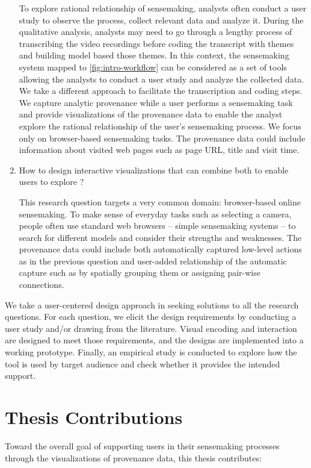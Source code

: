 \begin{enumerate}
	To explore rational relationship of sensemaking, analysts often conduct a user study to observe the process, collect relevant data and analyze it. During the qualitative analysis, analysts may need to go through a lengthy process of transcribing the video recordings before coding the transcript with themes and building model based those themes. In this context, the sensemaking system mapped to \autoref{fig:intro-workflow} can be considered as a set of tools allowing the analysts to conduct a user study and analyze the collected data. We take a different approach to facilitate the transcription and coding steps. We capture analytic provenance while a user performs a sensemaking task and provide visualizations of the provenance data to enable the analyst explore the rational relationship of the user's sensemaking process. We focus only on browser-based sensemaking tasks. The provenance data could include information about visited web pages such as page URL, title and visit time.
	
	\item How to design interactive visualizations that can combine both  to enable users to explore ?
	
	This research question targets a very common domain: browser-based online sensemaking. To make sense of everyday tasks such as selecting a camera, people often use standard web browsers -- simple sensemaking systems -- to search for different models and consider their strengths and weaknesses. The provenance data could include both automatically captured low-level actions as in the previous question and user-added relationship of the automatic capture such as by spatially grouping them or assigning pair-wise connections.
\end{enumerate}

We take a user-centered design approach in seeking solutions to all the research questions. For each question, we elicit the design requirements by conducting a user study and/or drawing from the literature. Visual encoding and interaction are designed to meet those requirements, and the designs are implemented into a working prototype. Finally, an empirical study is conducted to explore how the tool is used by target audience and check whether it provides the intended support. 

\section{Thesis Contributions}
Toward the overall goal of supporting users in their sensemaking processes through the visualizations of provenance data, this thesis contributes:

